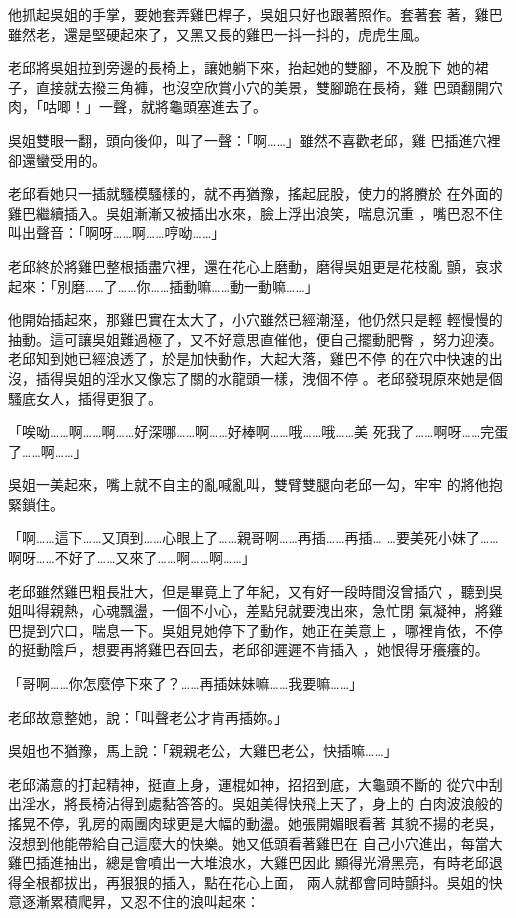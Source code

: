 他抓起吳姐的手掌，要她套弄雞巴桿子，吳姐只好也跟著照作。套著套
著，雞巴雖然老，還是堅硬起來了，又黑又長的雞巴一抖一抖的，虎虎生風。

老邱將吳姐拉到旁邊的長椅上，讓她躺下來，抬起她的雙腳，不及脫下
她的裙子，直接就去撥三角褲，也沒空欣賞小穴的美景，雙腳跪在長椅，雞
巴頭翻開穴肉，「咕唧！」一聲，就將龜頭塞進去了。

吳姐雙眼一翻，頭向後仰，叫了一聲：「啊……」雖然不喜歡老邱，雞
巴插進穴裡卻還蠻受用的。

老邱看她只一插就騷模騷樣的，就不再猶豫，搖起屁股，使力的將賸於
在外面的雞巴繼續插入。吳姐漸漸又被插出水來，臉上浮出浪笑，喘息沉重
，嘴巴忍不住叫出聲音：「啊呀……啊……哼呦……」

老邱終於將雞巴整根插盡穴裡，還在花心上磨動，磨得吳姐更是花枝亂
顫，哀求起來：「別磨……了……你……插動嘛……動一動嘛……」

他開始插起來，那雞巴實在太大了，小穴雖然已經潮溼，他仍然只是輕
輕慢慢的抽動。這可讓吳姐難過極了，又不好意思直催他，便自己擺動肥臀
，努力迎湊。老邱知到她已經浪透了，於是加快動作，大起大落，雞巴不停
的在穴中快速的出沒，插得吳姐的淫水又像忘了關的水龍頭一樣，洩個不停
。老邱發現原來她是個騷底女人，插得更狠了。

「唉呦……啊……啊……好深哪……啊……好棒啊……哦……哦……美
死我了……啊呀……完蛋了……啊……」

吳姐一美起來，嘴上就不自主的亂喊亂叫，雙臂雙腿向老邱一勾，牢牢
的將他抱緊鎖住。

「啊……這下……又頂到……心眼上了……親哥啊……再插……再插…
…要美死小妹了……啊呀……不好了……又來了……啊……啊……」

老邱雖然雞巴粗長壯大，但是畢竟上了年紀，又有好一段時間沒曾插穴
，聽到吳姐叫得親熱，心魂飄盪，一個不小心，差點兒就要洩出來，急忙閉
氣凝神，將雞巴提到穴口，喘息一下。吳姐見她停下了動作，她正在美意上
，哪裡肯依，不停的挺動陰戶，想要再將雞巴吞回去，老邱卻遲遲不肯插入
，她恨得牙癢癢的。

「哥啊……你怎麼停下來了？……再插妹妹嘛……我要嘛……」

老邱故意整她，說：「叫聲老公才肯再插妳。」

吳姐也不猶豫，馬上說：「親親老公，大雞巴老公，快插嘛……」

老邱滿意的打起精神，挺直上身，運棍如神，招招到底，大龜頭不斷的
從穴中刮出淫水，將長椅沾得到處黏答答的。吳姐美得快飛上天了，身上的
白肉波浪般的搖晃不停，乳房的兩團肉球更是大幅的動盪。她張開媚眼看著
其貌不揚的老吳，沒想到他能帶給自己這麼大的快樂。她又低頭看著雞巴在
自己小穴進出，每當大雞巴插進抽出，總是會噴出一大堆浪水，大雞巴因此
顯得光滑黑亮，有時老邱退得全根都拔出，再狠狠的插入，點在花心上面，
兩人就都會同時顫抖。吳姐的快意逐漸累積爬昇，又忍不住的浪叫起來：

